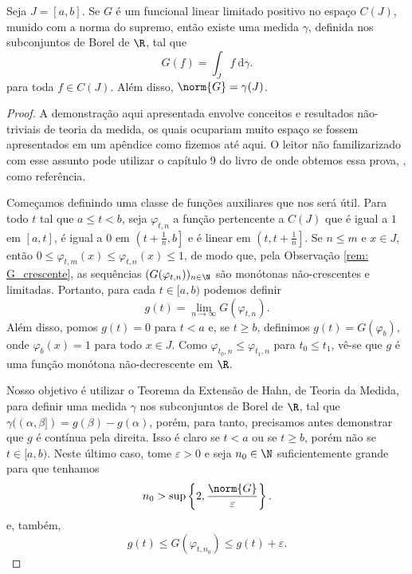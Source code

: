 \begin{teo}
    Seja \( J = [a, b] \).
    Se \( G \) é um funcional linear limitado positivo no espaço \( C(J) \), munido com a norma do supremo, então existe uma medida \( \gamma \), definida nos subconjuntos de Borel de \( \R \), tal que
    \begin{equation}
        G(f) = \int_{ J } f \ \mathrm{d}\gamma
        \label{eq: representation}
    .\end{equation}
    para toda \( f \in C(J) \).
    Além disso, \( \norm{ G } = \gamma(J) \).
\end{teo}
\begin{proof}
    A demonstração aqui apresentada envolve conceitos e resultados não-triviais de teoria da medida, os quais ocupariam muito espaço se fossem apresentados em um apêndice como fizemos até aqui.
    O leitor não familizarizado com esse assunto pode utilizar o capítulo 9 do livro de onde obtemos essa prova, \cite{bartle}, como referência.

    Começamos definindo uma classe de funções auxiliares que nos será útil.
    Para todo \( t \) tal que \( a \leq t < b \), seja \( \varphi_{ t,n } \) a função pertencente a \( C(J) \) que é igual a \( 1 \) em \( [a, t] \), é igual a \( 0 \) em \( \left(t+ \frac{ 1 }{ n }, b\right] \) e é linear em \( \left(t, t + \frac{ 1 }{ n }\right] \).
    Se \( n \leq m \) e \( x \in J \), então \( 0 \leq \varphi_{ t, m }(x) \leq \varphi_{ t, n }(x) \leq 1 \), de modo que, pela Observação \ref{rem: G_crescente}, as sequências \( (G(\varphi_{ t, n }))_{ n\in\N } \) são monótonas não-crescentes e limitadas.
    Portanto, para cada \( t \in [a, b) \) podemos definir \[
        g(t) = \lim_{ n\to\infty } G(\varphi_{ t,n })
    .\]
    Além disso, pomos \( g(t) = 0 \) para \( t < a \) e, se \( t \geq b \), definimos \( g(t) = G(\varphi_{ b }) \), onde \( \varphi_{ b }(x) = 1 \) para todo \( x \in J \).
    Como \( \varphi_{ t_{ 0 }, n } \leq \varphi_{ t_{ 1 }, n } \) para \( t_{ 0 } \leq t_{ 1 } \), vê-se que \( g \) é uma função monótona não-decrescente em \( \R \).

    Nosso objetivo é utilizar o Teorema da Extensão de Hahn, de Teoria da Medida, para definir uma medida \( \gamma \) nos subconjuntos de Borel de \( \R \), tal que \( \gamma((\alpha, \beta]) = g(\beta) - g(\alpha) \), porém, para tanto, precisamos antes demonstrar que \( g \) é contínua pela direita.
    Isso é claro se \( t < a \) ou se \( t \geq b \), porém não se \( t \in [a, b) \).
    Neste último caso, tome \( \varepsilon > 0 \) e seja \( n_{ 0 } \in \N \) suficientemente grande para que tenhamos
    \begin{equation}
        n_{ 0 } > \sup \left\{ 2, \frac{ \norm{ G } }{ \varepsilon } \right\}
        \label{eq: n0}
    .\end{equation}
    e, também,
    \begin{equation}
        g(t) \leq G(\varphi_{ t, n_{ 0 } }) \leq g(t) + \varepsilon
        \label{eq: g_sandwich}
    .\end{equation}


\end{proof}
